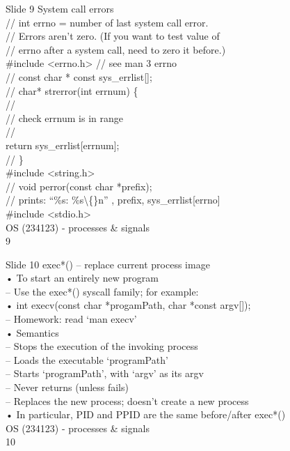 \documentclass{beamer}
\begin{document}
\begin{frame}{Slide 9}
System call errors\\// int errno = number of last system call error.\\// Errors aren’t zero. (If you want to test value of\\// errno after a system call, need to zero it before.)\\\#include <errno.h> // see man 3 errno\\// const char * const sys\_errlist[];\\// char* strerror(int errnum) \{ \\// \\// check errnum is in range\\// \\return sys\_errlist[errnum];\\// \}\\\#include <string.h>\\//  void perror(const char *prefix);\\// prints: “\%s: \%s\textbackslash\{\}n” , prefix, sys\_errlist[errno]\\\#include <stdio.h>\\OS (234123) - processes \& signals\\9
\end{frame}
\begin{frame}{Slide 10}
exec*() – replace current process image\\• To start an entirely new program\\– Use the exec*() syscall family; for example:\\• int execv(const char *progamPath, char *const argv[]);\\– Homework: read ‘man execv’\\• Semantics\\– Stops the execution of the invoking process\\– Loads the executable ‘programPath’ \\– Starts ‘programPath’, with ‘argv’ as its argv\\– Never returns (unless fails)\\– Replaces the new process; doesn’t create a new process\\• In particular, PID and PPID are the same before/after exec*() \\OS (234123) - processes \& signals\\10
\end{frame}
\end{document}
